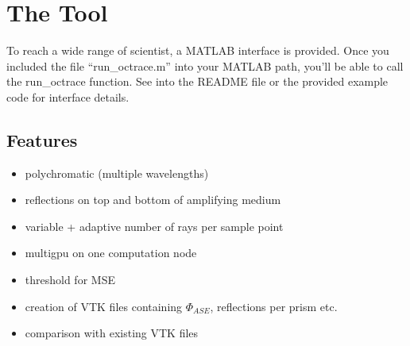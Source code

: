 \section{The Tool}
To reach a wide range of scientist, a MATLAB interface is provided. Once
you included the file ``run\_octrace.m'' into your MATLAB path, you'll be able
to call the run\_octrace function. See into the README file or the provided
example code for interface details.

\subsection{Features}
\begin{itemize}
  \item polychromatic (multiple wavelengths)
  \item reflections on top and bottom of amplifying medium
  \item variable + adaptive number of rays per sample point
  \item multigpu on one computation node
  \item threshold for MSE
  \item creation of VTK files containing $\Phi_{ASE}$, reflections per prism etc.
  \item comparison with existing VTK files 
\end{itemize}

